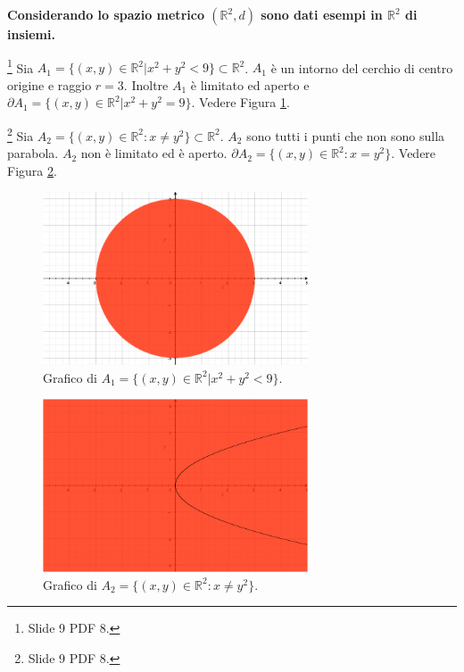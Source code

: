 \textbf{Considerando lo spazio metrico $(\mathbb R^2, d)$ sono dati esempi in $\mathbb R^2$ di insiemi.}
\begin{example}\footnote{Slide 9 PDF 8.}
    Sia $A_1=\{(x,y)\in\mathbb R^2|x^2+y^2<9\}\subset\mathbb R^2$. $A_1$ è un intorno del cerchio di centro origine e raggio $r=3$. Inoltre $A_1$ è limitato ed aperto e $\partial A_1=\{(x,y)\in\mathbb R^2|x^2+y^2=9\}$. Vedere Figura \ref{fig:A_1_esempio}.
\end{example}

\begin{example}\footnote{Slide 9 PDF 8.}
    Sia $A_2=\{(x, y)\in\mathbb R^2\colon x\neq y^2\}\subset\mathbb R^2$. $A_2$ sono tutti i punti che non sono sulla parabola. $A_2$ non è limitato ed è aperto. $\partial A_2=\{(x,y)\in\mathbb R^2\colon x=y^2\}$. Vedere Figura \ref{fig:A_2_esempio}.
\end{example}

\begin{figure}
    \centering
    \includegraphics[width=0.7\textwidth]{Analisi2/figures/A1.jpg}
    \caption{Grafico di $A_1=\{(x,y)\in\mathbb R^2|x^2+y^2<9\}$.}
    \label{fig:A_1_esempio}
\end{figure}

\begin{figure}
    \centering
    \includegraphics[width=0.7\textwidth]{Analisi2/figures/A2.jpg}
    \caption{Grafico di $A_2=\{(x, y)\in\mathbb R^2\colon x\neq y^2\}$.}
    \label{fig:A_2_esempio}
\end{figure}

